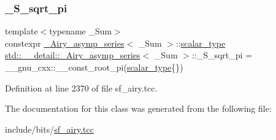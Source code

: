 \subsubsection{\texorpdfstring{\+\_\+\+S\+\_\+sqrt\+\_\+pi}{\_S\_sqrt\_pi}}
{\footnotesize\ttfamily template$<$typename \+\_\+\+Sum$>$ \\
constexpr \hyperlink{classstd_1_1____detail_1_1__Airy__asymp__series}{\+\_\+\+Airy\+\_\+asymp\+\_\+series}$<$ \+\_\+\+Sum $>$\+::\hyperlink{classstd_1_1____detail_1_1__Airy__asymp__series_ac2d0fa6d86d7a83c06dca057d0dfec3a}{scalar\+\_\+type} \hyperlink{classstd_1_1____detail_1_1__Airy__asymp__series}{std\+::\+\_\+\+\_\+detail\+::\+\_\+\+Airy\+\_\+asymp\+\_\+series}$<$ \+\_\+\+Sum $>$\+::\+\_\+\+S\+\_\+sqrt\+\_\+pi = \+\_\+\+\_\+gnu\+\_\+cxx\+::\+\_\+\+\_\+const\+\_\+root\+\_\+pi(\hyperlink{classstd_1_1____detail_1_1__Airy__asymp__series_ac2d0fa6d86d7a83c06dca057d0dfec3a}{scalar\+\_\+type}\{\})\hspace{0.3cm}{\ttfamily [static]}}



Definition at line 2370 of file sf\+\_\+airy.\+tcc.



The documentation for this class was generated from the following file\+:\begin{DoxyCompactItemize}
\item 
include/bits/\hyperlink{sf__airy_8tcc}{sf\+\_\+airy.\+tcc}\end{DoxyCompactItemize}
